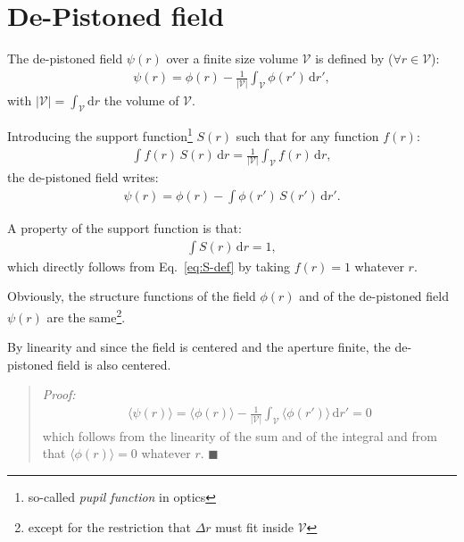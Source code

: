 \documentclass{article}
\begin{document}
\section{De-Pistoned field}

The de-pistoned field $\psi(r)$ over a finite size volume $\mathcal{V}$ is
defined by ($\forall r \in \mathcal{V}$):
\begin{align}
  \psi(r) = \phi(r) - \frac{1}{|\mathcal{V}|} \int_{\mathcal{V}} \phi(r')\,\mathrm{d}r',
\end{align}
with $|\mathcal{V}|=\int_{\mathcal{V}}\mathrm{d}r$ the volume of $\mathcal{V}$.

Introducing the support function\footnote{so-called \emph{pupil function} in
  optics} $S(r)$ such that for any function $f(r)$:
\begin{align}
  \label{eq:S-def}
  \int f(r)\,S(r)\,\mathrm{d}r = \frac{1}{|\mathcal{V}|} \int_{\mathcal{V}} f(r)\,\mathrm{d}r,
\end{align}
the de-pistoned field writes:
\begin{align}
  \psi(r) = \phi(r) - \int \phi(r')\,S(r')\,\mathrm{d}r'.
\end{align}

A property of the support function is that:
\begin{align}
  \int S(r)\,\mathrm{d}r = 1,
\end{align}
which directly follows from Eq.~\eqref{eq:S-def} by taking $f(r) = 1$ whatever $r$.

Obviously, the structure functions of the field $\phi(r)$ and of the de-pistoned
field $\psi(r)$ are the same\footnote{except for the restriction that
  $\Delta r$ must fit inside $\mathcal{V}$}.

By linearity and since the field is centered and the aperture finite, the
de-pistoned field is also centered.
\begin{quote}
  \emph{Proof:}
  \begin{align}
    \langle\psi(r)\rangle
    = \langle\phi(r)\rangle -
      \frac{1}{|\mathcal{V}|} \int_{\mathcal{V}} \langle\phi(r')\rangle\,\mathrm{d}r'
    = 0
  \end{align}
  which follows from the linearity of the sum and of the integral and from that
  $\langle\phi(r)\rangle = 0$ whatever $r$. $\blacksquare$
\end{quote}
\end{document}

